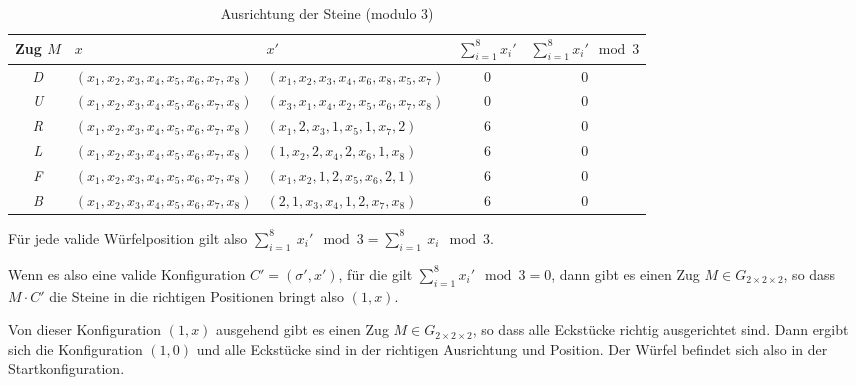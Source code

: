 \documentclass[12pt,a4paper, usenames, dvipsnames]{article}
\newcommand{\Gtwo}{\ensuremath{G_{2\times 2\times 2}}}
\begin{document}
\begin{table}[H]

\begin{small}
\begin{tabular}{cllcc}
{\footnotesize Zug $M$} & $x$ & $x'$ & {\footnotesize $\sum_{i= 1}^{8} x_i'$} & {\footnotesize $\sum_{i= 1}^{8}x_i'\mod 3$} \\
\hline
\textit{D} & $(x_1, x_2, x_3, x_4, x_5, x_6, x_7, x_8)$ & $(x_1, x_2, x_3, x_4, x_6, x_8, x_5, x_7)$ & 0 & 0 \\

\textit{U} & $(x_1, x_2, x_3, x_4, x_5, x_6, x_7, x_8)$ & $(x_3, x_1, x_4, x_2, x_5, x_6, x_7, x_8)$ & 0 & 0 \\

\textit{R} & $(x_1, x_2, x_3, x_4, x_5, x_6, x_7, x_8)$ & $(x_1, 2, x_3, 1, x_5, 1, x_7, 2)$ & 6 & 0 \\

\textit{L} & $(x_1, x_2, x_3, x_4, x_5, x_6, x_7, x_8)$ & $(1, x_2, 2, x_4, 2, x_6, 1, x_8)$ & 6 & 0 \\

\textit{F} & $(x_1, x_2, x_3, x_4, x_5, x_6, x_7, x_8)$ & $(x_1, x_2, 1, 2, x_5, x_6, 2, 1)$ & 6 & 0 \\

\textit{B} & $(x_1, x_2, x_3, x_4, x_5, x_6, x_7, x_8)$ & $(2, 1, x_3, x_4, 1, 2, x_7, x_8)$ & 6 & 0 \\


\end{tabular}
\end{small}
\caption[Ausrichtung der Steine (modulo 3)]{Ausrichtung der Steine (modulo 3)}

\end{table}

Für jede valide Würfelposition gilt also ${\sum_{i = 1}^{8} \ x_i' \mod 3 = \sum_{i = 1}^{8} \  x_i \mod 3 }$. 

Wenn es also eine valide Konfiguration $C'=(\sigma', x')$, für die gilt $\sum_{i = 1}^{8} x_i' \mod 3 = 0$, dann gibt es einen Zug $M \in \Gtwo$, so dass $M \cdot C'$ die Steine in die richtigen Positionen bringt also $(1,x)$. 

Von dieser Konfiguration $(1,x)$ ausgehend gibt es einen Zug $M \in \Gtwo$, so dass alle Eckstücke richtig ausgerichtet sind. Dann ergibt sich die Konfiguration $(1, 0)$ und alle Eckstücke sind in der richtigen Ausrichtung und Position. Der Würfel befindet sich also in der Startkonfiguration. 
%
%
%
%
%
%
%
%
%
%
%
%
%
%
%
%
%
%
%
%
\newpage
\end{document}
